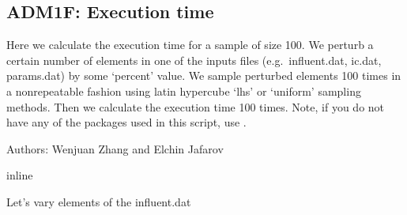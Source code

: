 \documentclass[a4paper,10pt,english]{sphinxmanual}
\begin{document}
\subsection{ADM1F: Execution time}
\label{\detokenize{jupyter_notebook/execution_time:ADM1F:-Execution-time}}\label{\detokenize{jupyter_notebook/execution_time::doc}}
\sphinxAtStartPar
Here we calculate the execution time for a sample of size 100. We perturb a certain number of elements in one of the inputs files (e.g. influent.dat, ic.dat, params.dat) by some ‘percent’ value. We sample perturbed elements 100 times in a non\sphinxhyphen{}repeatable fashion using latin hypercube ‘lhs’ or ‘uniform’ sampling methods. Then we calculate the execution time 100 times. Note, if you do not have any of the packages used in this script, use .

\sphinxAtStartPar
Authors: Wenjuan Zhang and Elchin Jafarov

{
\begin{sphinxVerbatim}[commandchars=\\\{\}]
\llap{\color{nbsphinxin}[1]:\,\hspace{\fboxrule}\hspace{\fboxsep}}   
 
   
 inline
\end{sphinxVerbatim}
}

{
\begin{sphinxVerbatim}[commandchars=\\\{\}]
\llap{\color{nbsphinxin}[2]:\,\hspace{\fboxrule}\hspace{\fboxsep}}
\end{sphinxVerbatim}
}

\sphinxAtStartPar
{} Let’s vary elements of the influent.dat
\end{document}
